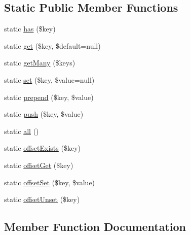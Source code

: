 \subsection*{Static Public Member Functions}
\begin{DoxyCompactItemize}
\item 
static \mbox{\hyperlink{class_illuminate_1_1_support_1_1_facades_1_1_config_ae0f1ddeede4ff756dadd4b6048c25888}{has}} (\$key)
\item 
static \mbox{\hyperlink{class_illuminate_1_1_support_1_1_facades_1_1_config_ac5241c47a6ee12cf3694dfde287a282e}{get}} (\$key, \$default=null)
\item 
static \mbox{\hyperlink{class_illuminate_1_1_support_1_1_facades_1_1_config_ab45caadb7b699ed2b74ce3b5b148f016}{get\+Many}} (\$keys)
\item 
static \mbox{\hyperlink{class_illuminate_1_1_support_1_1_facades_1_1_config_a7047f1890e3395145ad9653dd05e5091}{set}} (\$key, \$value=null)
\item 
static \mbox{\hyperlink{class_illuminate_1_1_support_1_1_facades_1_1_config_a2bd99f6f5d1781a64670f54279695e74}{prepend}} (\$key, \$value)
\item 
static \mbox{\hyperlink{class_illuminate_1_1_support_1_1_facades_1_1_config_a9e793f445e2052cc39b7529f9d865398}{push}} (\$key, \$value)
\item 
static \mbox{\hyperlink{class_illuminate_1_1_support_1_1_facades_1_1_config_a3e96fa02210901a504f5d6cecbb3058b}{all}} ()
\item 
static \mbox{\hyperlink{class_illuminate_1_1_support_1_1_facades_1_1_config_a9c38dfaca860625f3f3ec57ba2d94f62}{offset\+Exists}} (\$key)
\item 
static \mbox{\hyperlink{class_illuminate_1_1_support_1_1_facades_1_1_config_aafef797ee6d2b5dd5fb4c152015da9c4}{offset\+Get}} (\$key)
\item 
static \mbox{\hyperlink{class_illuminate_1_1_support_1_1_facades_1_1_config_ac8f6afca8969d60e4e3aab883debcaee}{offset\+Set}} (\$key, \$value)
\item 
static \mbox{\hyperlink{class_illuminate_1_1_support_1_1_facades_1_1_config_a5238463d5080f7a8bcd7a75ef481c4f5}{offset\+Unset}} (\$key)
\end{DoxyCompactItemize}


\subsection{Member Function Documentation}
\mbox{\label{class_illuminate_1_1_support_1_1_facades_1_1_config_a3e96fa02210901a504f5d6cecbb3058b}} 
